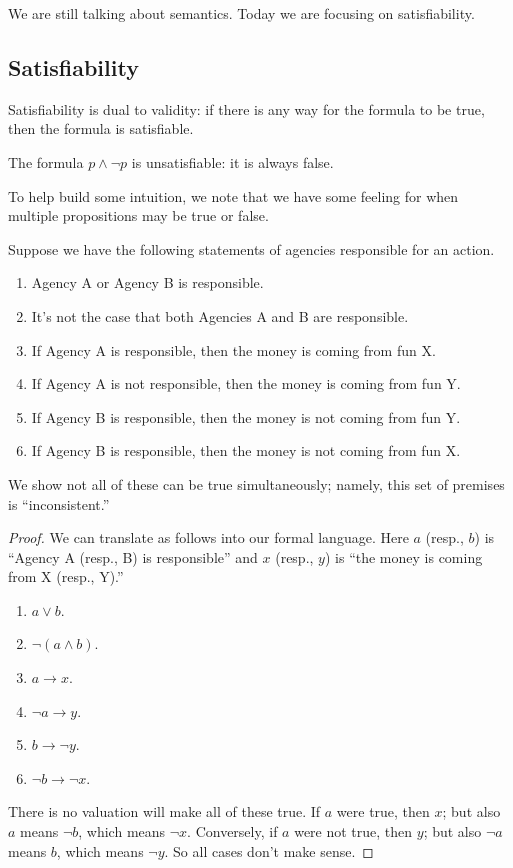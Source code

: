 
We are still talking about semantics. Today we are focusing on satisfiability.

\subsection{Satisfiability}
Satisfiability is dual to validity: if there is any way for the formula to be true, then the formula is satisfiable.
\begin{nex}
	The formula $p\land\lnot p$ is unsatisfiable: it is always false.
\end{nex}
To help build some intuition, we note that we have some feeling for when multiple propositions may be true or false.
\begin{exe}
	Suppose we have the following statements of agencies responsible for an action.
	\begin{enumerate}
		\item Agency A or Agency B is responsible.
		\item It's not the case that both Agencies A and B are responsible.
		\item If Agency A is responsible, then the money is coming from fun X.
		\item If Agency A is not responsible, then the money is coming from fun Y.
		\item If Agency B is responsible, then the money is not coming from fun Y.
		\item If Agency B is responsible, then the money is not coming from fun X.
	\end{enumerate}
	We show not all of these can be true simultaneously; namely, this set of premises is ``inconsistent.''
\end{exe}
\begin{proof}
	We can translate as follows into our formal language. Here $a$ (resp., $b$) is ``Agency A (resp., B) is responsible'' and $x$ (resp., $y$) is ``the money is coming from X (resp., Y).''
	\begin{enumerate}
		\item $a\lor b$.
		\item $\lnot(a\land b)$.
		\item $a\to x$.
		\item $\lnot a\to y$.
		\item $b\to\lnot y$.
		\item $\lnot b\to\lnot x$.
	\end{enumerate}
	There is no valuation will make all of these true. If $a$ were true, then $x$; but also $a$ means $\lnot b$, which means $\lnot x$. Conversely, if $a$ were not true, then $y$; but also $\lnot a$ means $b$, which means $\lnot y$. So all cases don't make sense.
\end{proof}
